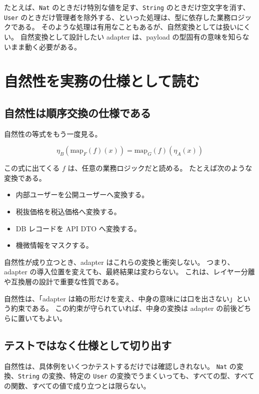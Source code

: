 たとえば、\texttt{Nat} のときだけ特別な値を足す、\texttt{String} のときだけ空文字を消す、\texttt{User} のときだけ管理者を除外する、といった処理は、型に依存した業務ロジックである。
そのような処理は有用なこともあるが、自然変換としては扱いにくい。
自然変換として設計したい adapter は、payload の型固有の意味を知らないまま動く必要がある。

\section{自然性を実務の仕様として読む}

\subsection{自然性は順序交換の仕様である}

自然性の等式をもう一度見る。

\[
  \eta_B(\mathrm{map}_F(f)(x))
  =
  \mathrm{map}_G(f)(\eta_A(x))
\]

この式に出てくる \(f\) は、任意の業務ロジックだと読める。
たとえば次のような変換である。

\begin{itemize}
\item 内部ユーザーを公開ユーザーへ変換する。
\item 税抜価格を税込価格へ変換する。
\item DB レコードを API DTO へ変換する。
\item 機微情報をマスクする。
\end{itemize}

自然性が成り立つとき、adapter はこれらの変換と衝突しない。
つまり、adapter の導入位置を変えても、最終結果は変わらない。
これは、レイヤー分離や互換層の設計で重要な性質である。

\begin{intuitionbox}
自然性は、「adapter は箱の形だけを変え、中身の意味には口を出さない」という約束である。
この約束が守られていれば、中身の変換は adapter の前後どちらに置いてもよい。
\end{intuitionbox}

\subsection{テストではなく仕様として切り出す}

自然性は、具体例をいくつかテストするだけでは確認しきれない。
\texttt{Nat} の変換、\texttt{String} の変換、特定の \texttt{User} の変換でうまくいっても、すべての型、すべての関数、すべての値で成り立つとは限らない。

